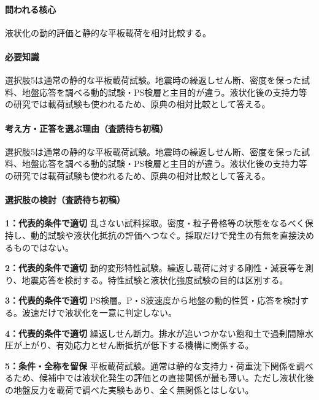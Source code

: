 \paragraph{問われる核心} 液状化の動的評価と静的な平板載荷を相対比較する。

\paragraph{必要知識} 選択肢5は通常の静的な平板載荷試験。地震時の繰返しせん断、密度を保った試料、地盤応答を調べる動的試験・PS検層と主目的が違う。液状化後の支持力等の研究では載荷試験も使われるため、原典の相対比較として答える。

\paragraph{考え方・正答を選ぶ理由（査読待ち初稿）} 選択肢5は通常の静的な平板載荷試験。地震時の繰返しせん断、密度を保った試料、地盤応答を調べる動的試験・PS検層と主目的が違う。液状化後の支持力等の研究では載荷試験も使われるため、原典の相対比較として答える。

\paragraph{選択肢の検討（査読待ち初稿）}\mbox{}\par

\noindent\textbf{1：代表的条件で適切} 乱さない試料採取。密度・粒子骨格等の状態をなるべく保持し、動的試験や液状化抵抗の評価へつなぐ。採取だけで発生の有無を直接決めるものではない。\par

\noindent\textbf{2：代表的条件で適切} 動的変形特性試験。繰返し載荷に対する剛性・減衰等を測り、地震応答を検討する。特性試験と液状化強度試験の目的は区別する。\par

\noindent\textbf{3：代表的条件で適切} PS検層。P・S波速度から地盤の動的性質・応答を検討する。波速だけで液状化を一意に判定しない。\par

\noindent\textbf{4：代表的条件で適切} 繰返しせん断力。排水が追いつかない飽和土で過剰間隙水圧が上がり、有効応力とせん断抵抗が低下する機構に関係する。\par

\noindent\textbf{5：条件・全称を留保} 平板載荷試験。通常は静的な支持力・荷重沈下関係を調べるため、候補中では液状化発生の評価との直接関係が最も薄い。ただし液状化後の地盤反力を載荷で調べた実験もあり、全く無関係とはしない。\par

